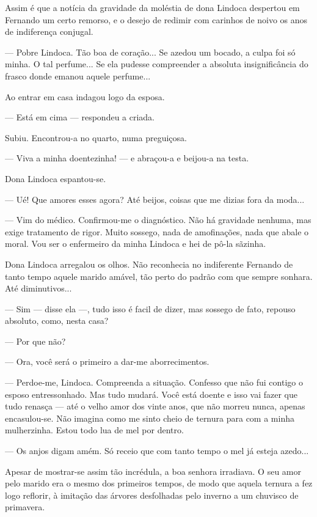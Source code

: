 Assim é que a notícia da gravidade da moléstia de dona Lindoca despertou
em Fernando um certo remorso, e o desejo de redimir com carinhos de
noivo os anos de indiferença conjugal.

--- Pobre Lindoca. Tão boa de coração... Se azedou um bocado, a culpa
foi só minha. O tal perfume... Se ela pudesse compreender a absoluta
insignificância do frasco donde emanou aquele perfume...

Ao entrar em casa indagou logo da esposa.

--- Está em cima --- respondeu a criada.

Subiu. Encontrou-a no quarto, numa preguiçosa.

--- Viva a minha doentezinha! --- e abraçou-a e beijou-a na testa.

Dona Lindoca espantou-se.

--- Ué! Que amores esses agora? Até beijos, coisas que me dizias fora da
moda...

--- Vim do médico. Confirmou-me o diagnóstico. Não há gravidade nenhuma,
mas exige tratamento de rigor. Muito sossego, nada de amofinações, nada
que abale o moral. Vou ser o enfermeiro da minha Lindoca e hei de pô-la
sãzinha.

Dona Lindoca arregalou os olhos. Não reconhecia no indiferente Fernando
de tanto tempo aquele marido amável, tão perto do padrão com que sempre
sonhara. Até diminutivos...

--- Sim --- disse ela ---, tudo isso é facil de dizer, mas sossego de
fato, repouso absoluto, como, nesta casa?

--- Por que não?

--- Ora, você será o primeiro a dar-me aborrecimentos.

--- Perdoe-me, Lindoca. Compreenda a situação. Confesso que não fui
contigo o esposo entressonhado. Mas tudo mudará. Você está doente e isso
vai fazer que tudo renasça --- até o velho amor dos vinte anos, que não
morreu nunca, apenas encasulou-se. Não imagina como me sinto cheio de
ternura para com a minha mulherzinha. Estou todo lua de mel por dentro.

--- Os anjos digam amém. Só receio que com tanto tempo o mel já esteja
azedo...

Apesar de mostrar-se assim tão incrédula, a boa senhora irradiava. O seu
amor pelo marido era o mesmo dos primeiros tempos, de modo que aquela
ternura a fez logo reflorir, à imitação das árvores desfolhadas pelo
inverno a um chuvisco de primavera.

